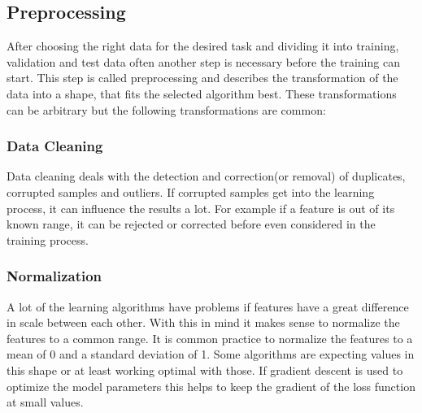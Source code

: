 \subsection{Preprocessing}\label{ssec:preprocessing}
After choosing the right data for the desired task and dividing it into training, validation and test data often another step is necessary before the training can start.
This step is called preprocessing and describes the transformation of the data into a shape, that fits the selected algorithm best.
These transformations can be arbitrary but the following transformations are common:
\subsubsection{Data Cleaning}
Data cleaning deals with the detection and correction(or removal) of duplicates, corrupted samples and outliers. 
If corrupted samples get into the learning process, it can influence the results a lot. For example if a feature is out of its known range, it can be rejected or corrected before even considered in the training process.
\subsubsection{Normalization}\label{ssec:normalization}
A lot of the learning algorithms have problems if features have a great difference in scale between each other. 
With this in mind it makes sense to normalize the features to a common range. 
It is common practice to normalize the features to a mean of 0 and a standard deviation of 1. Some algorithms are expecting values in this shape or at least working optimal with those. If gradient descent is used to optimize the model parameters this helps to keep the gradient of the loss function at small values.\cite{CholDeep2018}

